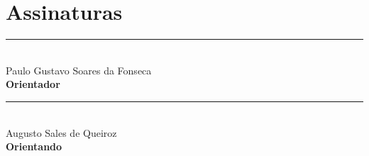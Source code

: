 \section{Assinaturas}

\vspace{2cm}
\begin{center}
    \rule{0.6\textwidth}{.4pt}\\ 
    Paulo Gustavo Soares da Fonseca\\
    \textbf{Orientador}\\
    \vspace{2cm}
    \rule{0.6\textwidth}{.4pt}\\ 
    Augusto Sales de Queiroz\\
    \textbf{Orientando}
\end{center}
